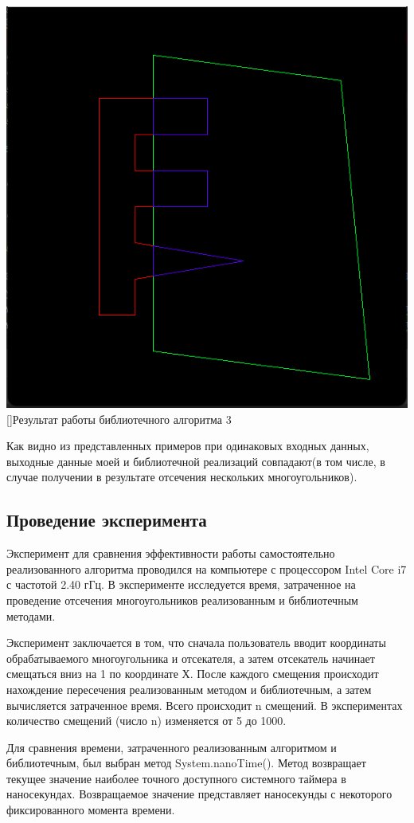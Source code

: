 \documentclass[12pt]{article}
\begin{document}
\vskip 1cm
{
    \centering
    \includegraphics[width=0.5\linewidth]{рез3_биб.png}
    []{Результат работы библиотечного алгоритма 3}
    \label{fig:i9}
}
\vskip 1cm





Как видно из представленных примеров при одинаковых входных данных, выходные данные моей и библиотечной реализаций совпадают(в том числе, в случае получении в результате отсечения нескольких многоугольников).




\subsection{Проведение эксперимента}

Эксперимент для сравнения эффективности работы самостоятельно реализованного алгоритма проводился на компьютере с процессором Intel Core i7 с частотой 2.40 гГц. В эксперименте исследуется
время, затраченное на проведение отсечения многоугольников реализованным и библиотечным методами.

Эксперимент заключается в том, что сначала пользователь вводит координаты обрабатываемого многоугольника и отсекателя, а затем отсекатель начинает смещаться вниз на 1 по координате Х. После
каждого смещения происходит нахождение пересечения реализованным методом и библиотечным, а затем вычисляется затраченное время. Всего происходит n смещений. В экспериментах количество смещений (число n)
изменяется от 5 до 1000.

Для сравнения времени, затраченного реализованным алгоритмом и библиотечным, был выбран метод
System.nanoTime(). Метод возвращает текущее значение наиболее точного доступного системного таймера
в наносекундах. Возвращаемое значение представляет наносекунды с некоторого фиксированного момента
времени.
\end{document}
